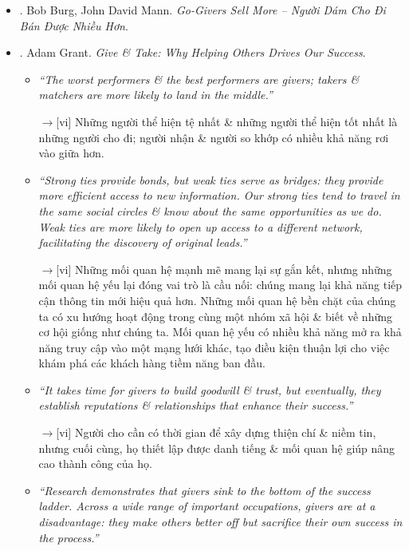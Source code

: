 \documentclass[12pt,twoside]{book}
\begin{document}
\begin{itemize}
	\item \cite{Burg_Mann_giver_VN}. {\sc Bob Burg, John David Mann}. {\it Go-Givers Sell More -- Người Dám Cho Đi Bán Được Nhiều Hơn}.
	\item \cite{Grant_give_take}. {\sc Adam Grant}. {\it Give \& Take: Why Helping Others Drives Our Success}.
	\begin{itemize}
		\item {\it``The worst performers \& the best performers are givers; takers \& matchers are more likely to land in the middle.''}
		
		{\sf[en]$\to$[vi]} Những người thể hiện tệ nhất \& những người thể hiện tốt nhất là những người cho đi; người nhận \& người so khớp có nhiều khả năng rơi vào giữa hơn.
		
		\item {\it``Strong ties provide bonds, but weak ties serve as bridges: they provide more efficient access to new information. Our strong ties tend to travel in the same social circles \& know about the same opportunities as we do. Weak ties are more likely to open up access to a different network, facilitating the discovery of original leads.''}
		
		{\sf[en]$\to$[vi]} Những mối quan hệ mạnh mẽ mang lại sự gắn kết, nhưng những mối quan hệ yếu lại đóng vai trò là cầu nối: chúng mang lại khả năng tiếp cận thông tin mới hiệu quả hơn. Những mối quan hệ bền chặt của chúng ta có xu hướng hoạt động trong cùng một nhóm xã hội \& biết về những cơ hội giống như chúng ta. Mối quan hệ yếu có nhiều khả năng mở ra khả năng truy cập vào một mạng lưới khác, tạo điều kiện thuận lợi cho việc khám phá các khách hàng tiềm năng ban đầu.
		
		\item {\it``It takes time for givers to build goodwill \& trust, but eventually, they establish reputations \& relationships that enhance their success.''}
		
		{\sf[en]$\to$[vi]} Người cho cần có thời gian để xây dựng thiện chí \& niềm tin, nhưng cuối cùng, họ thiết lập được danh tiếng \& mối quan hệ giúp nâng cao thành công của họ.		
		
		\item {\it``Research demonstrates that givers sink to the bottom of the success ladder. Across a wide range of important occupations, givers are at a disadvantage: they make others better off but sacrifice their own success in the process.''}
		

\end{itemize}
\end{itemize}
\end{document}
